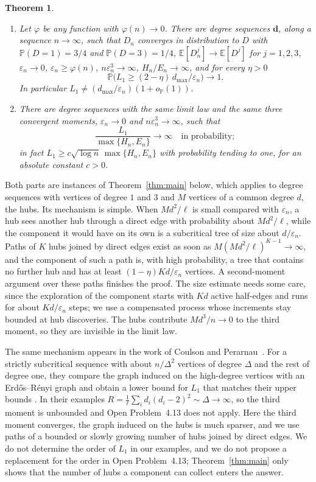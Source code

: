 \documentclass[11pt]{amsart}
\newtheorem{theorem}{Theorem}[section]
\theoremstyle{definition}
\theoremstyle{remark}
\numberwithin{equation}{section}
\newcommand{\PP}{\mathbb P}
\newcommand{\E}{\mathbb E}
\newcommand{\eps}{\varepsilon}
\newcommand{\dmax}{d_{\max}}
\begin{document}
\begin{theorem}\label{thm:examples}
\begin{enumerate}[label=\textup{(\alph*)}]
\item Let $\varphi$ be any function with $\varphi(n)\to0$. There are degree sequences $\mathbf d$, along a sequence $n\to\infty$, such that $D_n$ converges in distribution to $D$ with $\PP(D=1)=3/4$ and $\PP(D=3)=1/4$, $\E[D_n^j]\to\E[D^j]$ for $j=1,2,3$, $\eps_n\to0$, $\eps_n\ge\varphi(n)$, $n\eps_n^3\to\infty$, $H_n/E_n\to\infty$, and for every $\eta>0$
\[
\PP\bigl(L_1\ge(2-\eta)\,\dmax/\eps_n\bigr)\to1 .
\]
In particular $L_1\ne(\dmax/\eps_n)(1+o_\PP(1))$.
\item There are degree sequences with the same limit law and the same three convergent moments, $\eps_n\to0$ and $n\eps_n^3\to\infty$, such that
\[
\frac{L_1}{\max\{H_n,E_n\}}\to\infty\quad\text{in probability};
\]
in fact $L_1\ge c\sqrt{\log n}\,\max\{H_n,E_n\}$ with probability tending to one, for an absolute constant $c>0$.
\end{enumerate}
\end{theorem}

Both parts are instances of Theorem~\ref{thm:main} below, which applies to degree sequences with vertices of degree $1$ and $3$ and $M$ vertices of a common degree $d$, the hubs. Its mechanism is simple. When $Md^2/\ell$ is small compared with $\eps_n$, a hub sees another hub through a direct edge with probability about $Md^2/\ell$, while the component it would have on its own is a subcritical tree of size about $d/\eps_n$. Paths of $K$ hubs joined by direct edges exist as soon as $M(Md^2/\ell)^{K-1}\to\infty$, and the component of such a path is, with high probability, a tree that contains no further hub and has at least $(1-\eta)Kd/\eps_n$ vertices. A second-moment argument over these paths finishes the proof. The size estimate needs some care, since the exploration of the component starts with $Kd$ active half-edges and runs for about $Kd/\eps_n$ steps; we use a compensated process whose increments stay bounded at hub discoveries. The hubs contribute $Md^3/n\to0$ to the third moment, so they are invisible in the limit law.

The same mechanism appears in the work of Coulson and Perarnau~\cite{CP23}. For a strictly subcritical sequence with about $n/\Delta^2$ vertices of degree $\Delta$ and the rest of degree one, they compare the graph induced on the high-degree vertices with an Erd\H{o}s--R\'enyi graph and obtain a lower bound for $L_1$ that matches their upper bounds \cite[Proposition~1.12 and Remark~1.13]{CP23}. In their examples $R=\frac1\ell\sum_i d_i(d_i-2)^2\sim\Delta\to\infty$, so the third moment is unbounded and Open Problem~4.13 does not apply. Here the third moment converges, the graph induced on the hubs is much sparser, and we use paths of a bounded or slowly growing number of hubs joined by direct edges. We do not determine the order of $L_1$ in our examples, and we do not propose a replacement for the order in Open Problem~4.13; Theorem~\ref{thm:main} only shows that the number of hubs a component can collect enters the answer.
\end{document}

